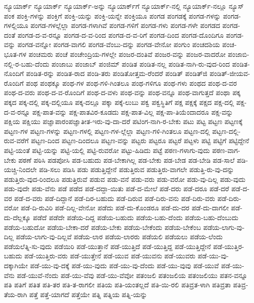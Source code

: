 {ನ್ಯೂಯಾರ್ಕ್
ನ್ಯೂಯಾರ್ಕ್‌
ನ್ಯೂಯಾರ್ಕ್‌-ಅನ್ನು
ನ್ಯೂಯಾರ್ಕ್‌ಗೆ
ನ್ಯೂಯಾರ್ಕ್‌-ನಲ್ಲಿ
ನ್ಯೂಯಾರ್ಕ್‌-ನಲ್ಲೂ
ನ್ಯೂಸ್
ಪಂಕ
ಪಂಕ್ತಿ-ಗಳನ್ನು
ಪಂಕ್ತಿಗೆ
ಪಂಕ್ತಿ-ಯನ್ನು
ಪಂಕ್ತಿ-ಯನ್ನೇ
ಪಂಕ್ತಿಯೂ
ಪಂಗಡ
ಪಂಗಡಕ್ಕೆ
ಪಂಗಡ-ಗಳನ್ನು
ಪಂಗಡ-ಗಳಲ್ಲಿಯೂ
ಪಂಗಡ-ಗಳಲ್ಲೆಲ್ಲಾ
ಪಂಗಡ-ಗಳಾಗಿವೆ
ಪಂಗಡ-ಗಳಿಗೆ
ಪಂಗಡ-ಗಳು
ಪಂಗಡ-ಗಳೇ
ಪಂಗಡದ
ಪಂಗಡ-ದಂತೆ
ಪಂಗಡ-ದ-ವ-ರನ್ನೂ
ಪಂಗಡ-ದ-ವ-ರಿಂದ
ಪಂಗಡ-ದ-ವ-ರಿಗೆ
ಪಂಗಡ-ದಿಂದ
ಪಂಗಡ-ದೊಂದಿಗೂ
ಪಂಗಡ-ವನ್ನು
ಪಂಗಡ-ವನ್ನೋ
ಪಂಗಡ-ವಾಗಲಿ
ಪಂಗಡ-ವೆಂಬು-ದನ್ನು
ಪಂಗಡ-ವೇನೋ
ಪಂಗುಂ
ಪಂಚದಶಿಯ
ಪಂಚ-ಭೂತ-ಗಳ
ಪಂಚಮರು
ಪಂಚೆ
ಪಂಚೇಂದ್ರಿಯ-ಗಳಲ್ಲೇ
ಪಂಜರ-ದಂತಿವೆ
ಪಂಜರ-ವನ್ನು
ಪಂಜರ-ವಾದರೋ
ಪಂಜಾಬಿ-ನಲ್ಲಿ-ರ-ಬಹು-ದೆಂದು
ಪಂಜಾಬು
ಪಂಜಾಬ್
ಪಂಜಿಮ್
ಪಂಡಿತ
ಪಂಡಿತ-ನಲ್ಲ
ಪಂಡಿತ-ನಾಗಿ-ರು-ವುದ-ರಿಂದ
ಪಂಡಿತ-ನೊಂದಿಗೆ
ಪಂಡಿತ-ರನ್ನು
ಪಂಡಿತ-ರಾದ
ಪಂಡಿ-ತರು
ಪಂಡಿತೋತ್ತಮ-ರೆಂದರೆ
ಪಂಡಿತ್‌
ಪಂಡಿತ್‌ಜಿ
ಪಂಡಿತ್‌-ಜೀಯವ-ರೊಂದಿಗೆ
ಪಂಥ
ಪಂಥಕ್ಕೂ
ಪಂಥ-ಗಳ
ಪಂಥ-ಗಳಿ-ಗಿಂತಲೂ
ಪಂಥ-ಗಳಿಗೂ
ಪಂಥ-ಗಳು
ಪಂಥದ
ಪಂಥ-ದ-ವರ
ಪಂಥ-ದ-ವರು
ಪಂಥ-ದ-ವ-ರೊಂದಿಗೆ
ಪಂಥ-ದ-ವಳು
ಪಂಥ-ವನ್ನು
ಪಂಥ-ವನ್ನೂ
ಪಂಥ-ವಾಗುತ್ತದೆ
ಪಂಥಾ
ಪಕ್ಕ
ಪಕ್ಕದ
ಪಕ್ಕ-ದಲ್ಲಿ
ಪಕ್ಕ-ದಲ್ಲಿಯೂ
ಪಕ್ಕ-ದಲ್ಲೂ
ಪಕ್ಕಾ
ಪಕ್ಕೆ-ಲುಬು
ಪಕ್ವ
ಪಕ್ವಸ್ಥಿತಿಗೆ
ಪಕ್ಷ
ಪಕ್ಷಕ್ಕೆ
ಪಕ್ಷದ
ಪಕ್ಷ-ದಲ್ಲಿ
ಪಕ್ಷ-ದ-ವ-ರನ್ನೂ
ಪಕ್ಷ-ಪಾತ-ವನ್ನು
ಪಕ್ಷ-ಪಾತವಿರ-ಕೂಡದು
ಪಕ್ಷ-ಪಾತ-ವಿಲ್ಲ
ಪಕ್ಷ-ಪಾ-ತಿಯೆಂದಾದರೂ
ಪಕ್ಷ-ವನ್ನು
ಪಕ್ಷಿಯ
ಪಕ್ಷಿಯು
ಪಜ್ಞಾಪಾರಂಪಜ್ಞಾತೀತ-ಇರು-ವು-ದಾ-ದರೆ
ಪಟಿಂಗ-ನಾಗಿ-ರ-ಬೇಕು
ಪಟು
ಪಟ್ಟ
ಪಟ್ಟಣ
ಪಟ್ಟಣಕ್ಕೆ
ಪಟ್ಟಣ-ಗಳ
ಪಟ್ಟಣ-ಗಳನ್ನು
ಪಟ್ಟಣ-ಗಳಲ್ಲಿ
ಪಟ್ಟಣ-ಗಳ-ಲ್ಲೆಲ್ಲಾ
ಪಟ್ಟಣ-ಗಳಿ-ಗಿಂತಲೂ
ಪಟ್ಟಣ-ದಲ್ಲಿ
ಪಟ್ಟಣ-ದಲ್ಲಿ-ರುವ-ವರೆಗೆ
ಪಟ್ಟಣ-ದಿಂದ
ಪಟ್ಟಣ-ದಿಂದಲೂ
ಪಟ್ಟಣ-ವನ್ನು
ಪಟ್ಟರು
ಪಟ್ಟರೂ
ಪಟ್ಟರೆ
ಪಟ್ಟಳು
ಪಟ್ಟಿ
ಪಟ್ಟಿಗೆ
ಪಟ್ಟಿದ್ದೇನೆ
ಪಟ್ಟಿ-ಯಂತೆ
ಪಟ್ಟಿ-ಯನ್ನು
ಪಟ್ಟಿ-ಯಲ್ಲಿ
ಪಟ್ಟಿ-ರುವರೋ
ಪಟ್ಟು-ಹಿಡಿದು
ಪಟ್ಟೆ
ಪಠಣ-ಗಳಾಗು-ವುದು
ಪಠಣ-ವಾಗ-ಬೇಕು
ಪಠಣೆ
ಪಠಿಸಿ
ಪಡಪೋಸಿ
ಪಡ-ಬಹುದು
ಪಡ-ಬೇಕಾಗಿಲ್ಲ
ಪಡ-ಬೇಕು
ಪಡ-ಬೇಡ
ಪಡ-ಬೇಡಿ
ಪಡ-ಸಾಲೆ
ಪಡಿ-ಯಚ್ಚಿ-ನಿಂದಲೇ
ಪಡಿ-ಸಲು
ಪಡಿಸಿ
ಪಡು
ಪಡುತ್ತಿದ್ದೇನೆ
ಪಡುತ್ತಿರುವ
ಪಡುತ್ತಿರು-ವಾಗಲೇ
ಪಡುತ್ತಿ-ರು-ವು-ದನ್ನು
ಪಡುತ್ತಿರು-ವುದ-ರಿಂದಲೂ
ಪಡುತ್ತಿರುವೆ
ಪಡುವ
ಪಡು-ವನೆ
ಪಡು-ವರು
ಪಡು-ವರೋ
ಪಡು-ವು-ದಿಲ್ಲ
ಪಡು-ವುದು
ಪಡು-ವುದೇ
ಪಡು-ವೆನು
ಪಡೆ
ಪಡೆದ
ಪಡೆ-ದದ್ದಾ-ಯಿತು
ಪಡೆ-ದ-ಮೇಲೆ
ಪಡೆ-ದರು
ಪಡೆ-ದರೂ
ಪಡೆ-ದರೆ
ಪಡೆ-ದ-ವರ
ಪಡೆ-ದ-ವರು
ಪಡೆ-ದಿದ್ದಾನೆ
ಪಡೆ-ದಿರ-ಬಹುದು
ಪಡೆ-ದಿರುವ
ಪಡೆ-ದಿರು-ವನು
ಪಡೆ-ದಿರು-ವರು
ಪಡೆ-ದಿರು-ವರೋ
ಪಡೆ-ದಿ-ರುವಿರಿ
ಪಡೆ-ದಿಲ್ಲ-ವೇನೋ
ಪಡೆದು
ಪಡೆ-ದು-ಕೊಂಡರೂ
ಪಡೆ-ದು-ದರ
ಪಡೆ-ದು-ದಾಗಲೀ
ಪಡೆ-ದು-ದೆಲ್ಲಕ್ಕೂ
ಪಡೆದೆ
ಪಡೆದೇ
ಪಡೆಯ-ದಿದ್ದ
ಪಡೆಯ-ಬಹುದು
ಪಡೆಯ-ಬಹು-ದೆಂದು
ಪಡೆಯ-ಬಹು-ದೆಂಬುದು
ಪಡೆಯ-ಬಹುದೋ
ಪಡೆಯ-ಬೇಕಾ-ದರೆ
ಪಡೆಯ-ಬೇಕು
ಪಡೆಯ-ಬೇಕೆಂದು
ಪಡೆಯ-ಬೇಕೆಂಬ
ಪಡೆಯ-ಲಾಗು-ವು-ದಿಲ್ಲ
ಪಡೆಯ-ಲಾಗು-ವು-ದಿಲ್ಲವೆ
ಪಡೆಯ-ಲಾರ
ಪಡೆಯ-ಲಾರರು
ಪಡೆಯಲಿ
ಪಡೆಯಲು
ಪಡೆಯ-ಲೆಂದು
ಪಡೆಯಲೆತ್ನಿ-ಸು-ವುದು
ಪಡೆಯಿರಿ
ಪಡೆ-ಯುತ್ತಾನೆ
ಪಡೆ-ಯುತ್ತಿದೆ
ಪಡೆ-ಯುತ್ತಿದ್ದ
ಪಡೆ-ಯುತ್ತಿದ್ದೇನೆ
ಪಡೆ-ಯುತ್ತಿರ-ಬಹುದು
ಪಡೆ-ಯುತ್ತಿರು-ವರು
ಪಡೆ-ಯುತ್ತೇನೆ
ಪಡೆ-ಯುವ
ಪಡೆ-ಯುವನು
ಪಡೆ-ಯುವರು
ಪಡೆ-ಯು-ವು-ದಕ್ಕಾಗಿಯೇ
ಪಡೆ-ಯು-ವು-ದಕ್ಕೆ
ಪಡೆ-ಯು-ವುದು
ಪಡೆ-ಯು-ವು-ದೆಂದು
ಪಡೆ-ಯು-ವುವು
ಪಡೆ-ಯುವೆ
ಪಡೆ-ಯು-ವೆನು
ಪಡೆ-ಯುವೆ-ನೆಂದು
ಪಡೆ-ಯು-ವೆವು
ಪಡೆ-ಯು-ವೆವೋ
ಪತಂಜಲಿ
ಪತಂಜಲಿಯ
ಪತಂಜಲಿಯು
ಪತನ-ವನ್ನೂ
ಪತಿ
ಪತಿಗೆ
ಪತಿತ
ಪತಿ-ತರ
ಪತಿ-ತ-ರಾಗಲೀ
ಪತಿಯ
ಪತಿ-ಯಂತಲ್ಲದೆ
ಪತಿ-ಯಿ-ರಲಿ
ಪತಿವ್ರತ-ಳಾಗಿ
ಪತಿವ್ರತಾ
ಪತಿವ್ರ-ತೆಯ-ರಾಗಿ
ಪತ್ತೆ
ಪತ್ತೆ-ಯಾಗದೆ
ಪತ್ತೆಯೇ
ಪತ್ನಿ
ಪತ್ನಿಯ
ಪತ್ನಿ-ಯನ್ನು
}
